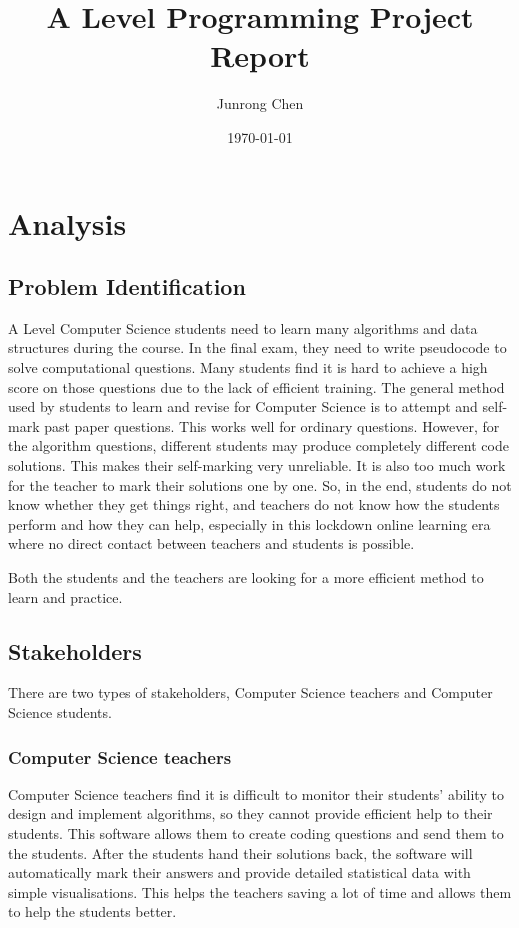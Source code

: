 \documentclass[a4paper]{report}
\title{A Level Programming Project Report}
\author{Junrong Chen}
\date{\today}
\begin{document}
\maketitle
\tableofcontents
\clearpage
\chapter{Analysis}

\section{Problem Identification}

A Level Computer Science students need to learn many algorithms and data structures during the course. In the final exam, they need to write pseudocode to solve computational questions. Many students find it is hard to achieve a high score on those questions due to the lack of efficient training. The general method used by students to learn and revise for Computer Science is to attempt and self-mark past paper questions. This works well for ordinary questions. However, for the algorithm questions, different students may produce completely different code solutions. This makes their self-marking very unreliable. It is also too much work for the teacher to mark their solutions one by one. So, in the end, students do not know whether they get things right, and teachers do not know how the students perform and how they can help, especially in this lockdown online learning era where no direct contact between teachers and students is possible.

Both the students and the teachers are looking for a more efficient method to learn and practice.

\section{Stakeholders}

There are two types of stakeholders, Computer Science teachers and Computer Science students.

\subsection{Computer Science teachers}

Computer Science teachers find it is difficult to monitor their students' ability to design and implement algorithms, so they cannot provide efficient help to their students. This software allows them to create coding questions and send them to the students. After the students hand their solutions back, the software will automatically mark their answers and provide detailed statistical data with simple visualisations. This helps the teachers saving a lot of time and allows them to help the students better.
\end{document}
